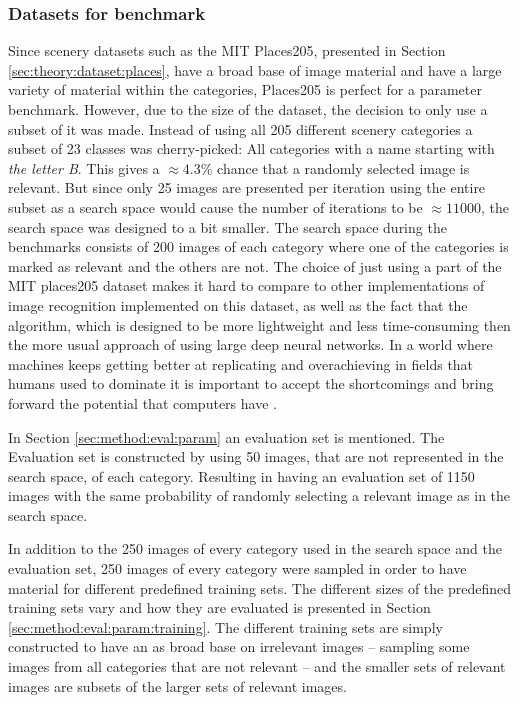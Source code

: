 \subsubsection{Datasets for benchmark}
\label{sec:meth:eval:bench:dataset}

Since scenery datasets such as the MIT Places205, presented in Section \ref{sec:theory:dataset:places}, have a broad base of image material and have a large variety of material within the categories, Places205 is perfect for a parameter benchmark. However, due to the size of the dataset, the decision to only use a subset of it was made. Instead of using all 205 different scenery categories a subset of 23 classes was cherry-picked: All categories with a name starting with \emph{the letter B}. This gives a $\approx 4.3\%$ chance that a randomly selected image is relevant. But since only 25 images are presented per iteration using the entire subset as a search space would cause the number of iterations to be $\approx 11000$, the search space was designed to a bit smaller. The search space during the benchmarks consists of 200 images of each category where one of the categories is marked as relevant and the others are not. 
The choice of just using a part of the MIT places205 dataset makes it hard to compare to other implementations of image recognition implemented on this dataset, as well as the fact that the algorithm, which is designed to be more lightweight and less time-consuming then the more usual approach of using large deep neural networks. In a world where machines keeps getting better at replicating and overachieving in fields that humans used to dominate it is important to accept the shortcomings and bring forward the potential that computers have \cite{eetimes2015johnson}\cite{forbes2015thomsen}\cite{he2015delving}. 

In Section \ref{sec:method:eval:param} an evaluation set is mentioned. The Evaluation set is constructed by using 50 images, that are not represented in the search space, of each category. Resulting in having an evaluation set of 1150 images with the same probability of randomly selecting a relevant image as in the search space.  

In addition to the 250 images of every category used in the search space and the evaluation set, 250 images of every category were sampled in order to have material for different predefined training sets. The different sizes of the predefined training sets vary and how they are evaluated is presented in Section \ref{sec:method:eval:param:training}. The different training sets are simply constructed to have an as broad base on irrelevant images -- sampling some images from all categories that are not relevant -- and the smaller sets of relevant images are subsets of the larger sets of relevant images.  

